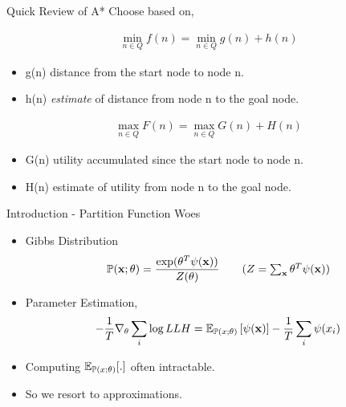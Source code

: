 \begin{frame}{Quick Review of A*}
  Choose based on,
  \begin{overprint}
    \begin{align*}
      \min_{n \in Q} f(n) = \min_{n \in Q} g(n) + h(n)
    \end{align*}
    \begin{itemize}
    \item g(n) distance from the start node to node n.
    \item h(n) \emph{estimate} of distance from node n to the goal node.
    \end{itemize}
    \begin{align*}
      \max_{n \in Q} F(n) = \max_{n \in Q} G(n) + H(n)
    \end{align*}
    \begin{itemize}
    \item G(n) utility accumulated since the start node to node n.
    \item H(n) estimate of utility from node n to the goal node.
    \end{itemize}
  \end{overprint}
\end{frame}
\begin{frame}{Introduction - Partition Function Woes}
  \begin{itemize}[<+->]
  \item Gibbs Distribution
    \begin{align*}
      \Pr(\x;\theta) =\frac{\exp(\theta^T\psi(\x))}{Z(\theta)} \tag{$Z=\sum_{\x} \theta^T\psi(\x)$}
    \end{align*}
  \item Parameter Estimation,
    \begin{align*}
      - \frac{1}{T}\nabla_\theta \sum_i\log LLH = \operatorname{\mathbb{E}}_{\mathbb{P}(x;\theta)}\left[\psi(\operatorname{\mathbf{x}})\right] - \frac{1}{T} \sum_i\psi(x_i)
    \end{align*}
  \item Computing $\operatorname{\mathbb{E}}_{\mathbb{P}(x;\theta)}[.]$ often intractable.
  \item So we resort to approximations.
  \end{itemize}
\end{frame}

